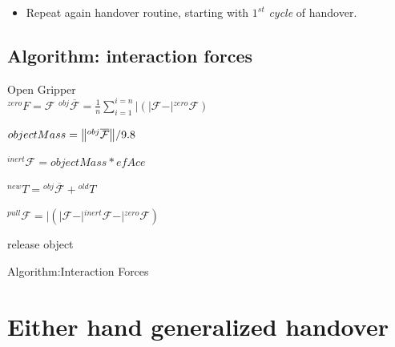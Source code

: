 \begin{itemize}
    \item Repeat again handover routine, starting with $1^{st}$ \textit{cycle} of handover.
\end{itemize}


\subsection{Algorithm: interaction forces}
\begin{algorithm}[H]\label{interaction forces}
	\DontPrintSemicolon
	\SetNoFillComment
	
	
	{
		{
		    Open Gripper\\
			$\mathcal{}^{zero}{F}= \mathcal{F}$
		}
		${}^{obj}\overline{\mathcal{F}} = \frac{1}{n}\sum_{i=1}^{i=n} \vert{ (\vert{\mathcal{F}} - \vert{{}^{zero}\mathcal{F}}) }$
		
		$objectMass = \norm{{}^{obj}\overline{\mathcal{F}}}/9.8 $
		
		${}^{inert}\mathcal{F} = objectMass * efAce$ 
		
		${}^{new}T = {}^{obj}\overline{\mathcal{F}} + {}^{old}T$
		
		{	
			${}^{pull}\mathcal{F} = \vert{(\vert\mathcal{{F}} - \vert{}^{inert}\mathcal{{F}} - \vert{}^{zero}\mathcal{{F}}) }$
			
			{
				\textrm{release object}
			}
		}
	}
	\caption{Algorithm:Interaction Forces}
\end{algorithm}



\section{Either hand generalized handover}\label{both hands individual}

